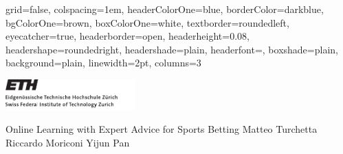 \documentclass[a0paper,landscape,final]{baposter}
\begin{document}

\begin{poster}{
  grid=false,
  colspacing=1em,
  headerColorOne=blue,
  borderColor=darkblue,
  bgColorOne=brown,
  boxColorOne=white,
  textborder=roundedleft,
  eyecatcher=true,
  headerborder=open,
  headerheight=0.08\textheight,
  headershape=roundedright,
  headershade=plain,
  headerfont=\Large\textsf, %
  boxshade=plain,
  background=plain,
  linewidth=2pt,
  columns=3
  }
  {{\begin{minipage}{1.5cm}
    \vspace{0.5cm}
	\includegraphics[width=5cm]{ethzlogo}
\end{minipage}}
  } %
  {\sf %
  {\huge Online Learning with Expert Advice for Sports Betting}}
  {\sf %
  Matteo Turchetta\hspace{1cm}
  Riccardo Moriconi\hspace{1cm}
  Yijun Pan\\
  }
  

\end{poster}
\end{document}
